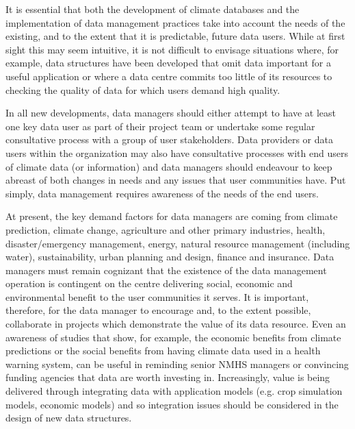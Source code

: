 
It is essential that both the development of climate databases and the implementation of data
management practices take into account the needs of the existing, and to the extent that it is
predictable, future data users. While at first sight this may seem intuitive, it is not difficult to
envisage situations where, for example, data structures have been developed that omit data
important for a useful application or where a data centre commits too little of its resources to
checking the quality of data for which users demand high quality.

In all new developments, data managers should either attempt to have at least one key data
user as part of their project team or undertake some regular consultative process with a group of
user stakeholders. Data providers or data users within the organization may also have
consultative processes with end users of climate data (or information) and data managers
should endeavour to keep abreast of both changes in needs and any issues that user
communities have. Put simply, data management requires awareness of the needs of the end
users.

At present, the key demand factors for data managers are coming from climate prediction,
climate change, agriculture and other primary industries, health, disaster/emergency
management, energy, natural resource management (including water), sustainability, urban
planning and design, finance and insurance. Data managers must remain cognizant that the
existence of the data management operation is contingent on the centre delivering social,
economic and environmental benefit to the user communities it serves. It is important, 
therefore, for the data manager to encourage and, to the extent possible, collaborate in projects which
demonstrate the value of its data resource. Even an awareness of studies that show, for
example, the economic benefits from climate predictions or the social benefits from having
climate data used in a health warning system, can be useful in reminding senior NMHS
managers or convincing funding agencies that data are worth investing in. Increasingly, value is
being delivered through integrating data with application models (e.g. crop simulation models,
economic models) and so integration issues should be considered in the design of new data
structures.